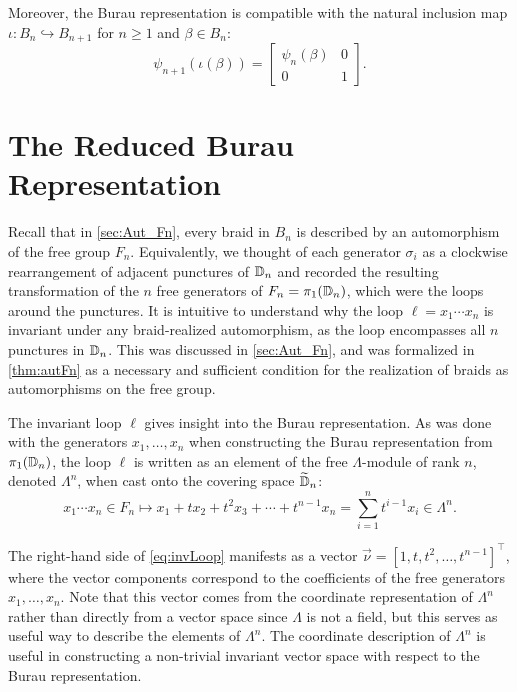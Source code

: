Moreover, the Burau representation is compatible with the natural inclusion map $\iota:B_n\hookrightarrow B_{n+1}$ for $n\geq 1$ and $\beta\in B_n$:
\begin{equation}
    \psi_{n+1}(\iota(\beta)) = \begin{bmatrix}
        \psi_n(\beta) & 0 \\
        0 & 1
    \end{bmatrix}.
\end{equation}

\section{The Reduced Burau Representation}
Recall that in \cref{sec:Aut_Fn}, every braid in $B_n$ is described by an automorphism of the free group $F_n$. Equivalently, we thought of each generator $\sigma_i$ as a clockwise rearrangement of adjacent punctures of $\mathbb{D}_n$ and recorded the resulting transformation of the $n$ free generators of $F_n = \pi_1(\mathbb{D}_n)$, which were the loops around the punctures. It is intuitive to understand why the loop $\ell=x_1\cdots x_n$ is invariant under any braid-realized automorphism, as the loop  encompasses all $n$ punctures in $\mathbb{D}_n$. This was discussed in \cref{sec:Aut_Fn}, and was formalized in \cref{thm:autFn} as a necessary and sufficient condition for the realization of braids as automorphisms on the free group.

The invariant loop $\ell$ gives insight into the Burau representation. As was done with the generators $x_1,\dots,x_n$ when constructing the Burau representation from $\pi_1(\mathbb{D}_n)$, the loop $\ell$ is written as an element of the free $\Lambda$-module of rank $n$, denoted $\Lambda^n$, when cast onto the covering space $\widetilde{\mathbb{D}}_n$:
\begin{equation}
    x_1\cdots x_n\in F_n\mapsto x_1+t x_2 + t^2 x_3 + \cdots + t^{n-1}x_n = \sum_{i=1}^{n}t^{i-1}x_i\in\Lambda^n.\label{eq:invLoop}
\end{equation}

The right-hand side of \cref{eq:invLoop} manifests as a vector $\vec{\nu}={\left[ 1,t,t^2,\dots,t^{n-1} \right]}^\top$, where the vector components correspond to the coefficients of the free generators $x_1,\dots,x_n$. Note that this vector comes from the coordinate representation of $\Lambda^n$ rather than directly from a vector space since $\Lambda$ is not a field, but this serves as useful way to describe the elements of $\Lambda^n$. The coordinate description of $\Lambda^n$ is useful in constructing a non-trivial invariant vector space with respect to the Burau representation.

